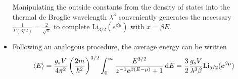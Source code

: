 \documentclass[11pt, a4paper]{article}
\newcommand{\diff}{\mathop{}\!\mathrm{d}} %
\begin{document}
\begin{itemize}
	Manipulating the outside constants from the density of states into the thermal de Broglie wavelength $ \lambda^{3} $ conveniently generates the necessary $ \frac{1}{\Gamma(3/2)} = \frac{2}{\sqrt{\pi}} $ to complete $ \mathrm{Li}_{3/2}(e^{\beta \mu}) $ with $ x = \beta E $.
	
	\item Following an analogous procedure, the average energy can be written
	\begin{equation*}
		\expval{E} = \frac{g_{s}V}{4\pi^{2}} \left(\frac{2m}{\hbar^{2}}\right)^{3/2} \int_{0}^{\infty}\frac{E^{3/2}}{z^{-1}e^{\beta (E - \mu)} + 1} \diff E = \frac{3}{2}\frac{g_{s}V}{\lambda^{3}\beta}\mathrm{Li}_{5/2}(e^{\beta \mu})
	\end{equation*}
		

\end{itemize}
\end{document}
